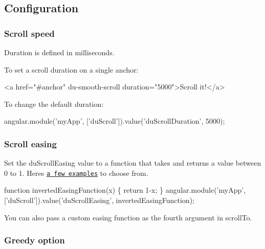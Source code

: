 

\subsection*{Configuration }

\subsubsection*{Scroll speed}

Duration is defined in milliseconds.

To set a scroll duration on a single anchor\+: 
\begin{DoxyCode}
<a href="#anchor" du-smooth-scroll duration="5000">Scroll it!</a>
\end{DoxyCode}


To change the default duration\+: 
\begin{DoxyCode}
angular.module('myApp', ['duScroll']).value('duScrollDuration', 5000);
\end{DoxyCode}


\subsubsection*{Scroll easing}

Set the {\ttfamily du\+Scroll\+Easing} value to a function that takes and returns a value between 0 to 1. Here\textquotesingle{}s \href{https://gist.github.com/gre/1650294}{\tt a few examples} to choose from.


\begin{DoxyCode}
function invertedEasingFunction(x) \{
  return 1-x;
\}
angular.module('myApp', ['duScroll']).value('duScrollEasing', invertedEasingFunction);
\end{DoxyCode}


You can also pass a custom easing function as the fourth argument in {\ttfamily scroll\+To}.

\subsubsection*{Greedy option}


